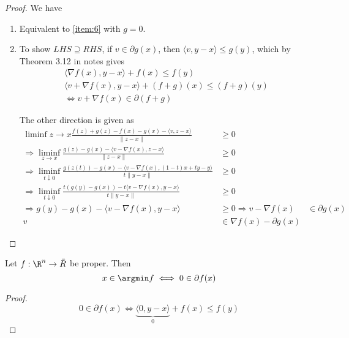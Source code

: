 \begin{proof}
  We have
  \begin{enumerate}
  \item Equivalent to \ref{item:6} with $g = 0$.
  \item To show $LHS \supseteq RHS$, if $v \in \partial g(x)$, then
    $\langle v, y - x \rangle \leq g(y)$, which by Theorem 3.12 in
    notes gives
    \begin{align}
      \label{eq:28}
      \langle \nabla f(x), y - x \rangle + f(x) \leq f(y) \\
      \langle v + \nabla f(x), y - x \rangle + (f + g)(x) \leq (f +
      g)(y) \\
      \iff v + \nabla f(x) \in \partial (f + g)
    \end{align}

    The other direction is given as
    \begin{align}
      \label{eq:29}
      \liminf{z \rightarrow x} \frac{f(z) + g(z) - f(x) - g(x) -
        \langle v, z - x \rangle}{\| z - x \|} &\geq 0 \\
      \Rightarrow \liminf_{z \rightarrow x} \frac{g(z) - g(x) - \langle v -
        \nabla f(x), z - x \rangle}{\| z - x \|} &\geq 0 \\
      \Rightarrow \liminf_{t \downarrow 0} \frac{g(z(t)) - g(x) -
        \langle v - \nabla f(x), (1 - t) x + ty - y \rangle}{t \| y -
        x \|} &\geq 0 \\
      \Rightarrow \liminf_{t \downarrow 0} \frac{t(g(y) - g(x)) - t
        \langle v - \nabla f(x), y - x \rangle}{t \| y - x \|} &\geq 0
    \\
    \Rightarrow g(y) - g(x) - \langle v - \nabla f(x), y - x \rangle
    &\geq 0
    \Rightarrow v - \nabla f(x) &\in \partial g(x) \\
    v &\in \nabla f(x) - \partial g(x)
    \end{align}
  \end{enumerate}
\end{proof}

\begin{thm}
  \label{defn:cones_and_generalized_inequalities:2}
  Let $f: \R^{n} \rightarrow \bar R$ be proper.  Then
  \begin{equation}
    \label{eq:30}
    x \in \argmin f \iff 0 \in \partial f(x)
  \end{equation}
\end{thm}

\begin{proof}
  \begin{equation}
    \label{eq:31}
    0 \in \partial f(x) \iff 
    \underbrace{\langle 0, y -x \rangle}_{0} + f(x) \leq f(y)
  \end{equation}
\end{proof}

